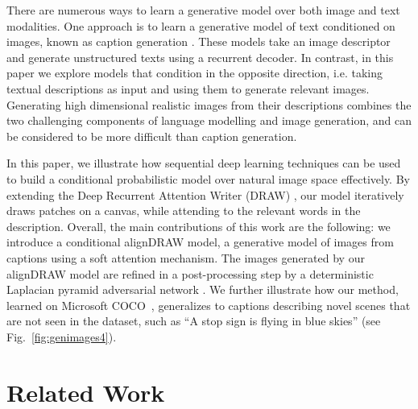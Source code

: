 \documentclass{article} %
\newcommand{\Figref}[1]{Fig.~\ref{#1}}
\begin{document}
There are numerous ways to learn a generative model over both image and text modalities. One approach is to learn a generative model of text conditioned on images, known as caption generation
\citep{karpathy_captions,vinyals_captions,xu_captions}. These models take an image descriptor and generate unstructured texts using a recurrent decoder. In contrast, in this paper we explore models that condition in the opposite direction, i.e. taking textual descriptions as input and using them to generate relevant images.
Generating high dimensional realistic images from their descriptions 
combines the two challenging components of language modelling and image generation, and can be considered to be more difficult than caption generation. %

In this paper, we illustrate how sequential deep learning techniques can be used to build a conditional probabilistic model over natural image space effectively. By extending the Deep Recurrent Attention Writer (DRAW) \citep{gregor_draw}, our model iteratively draws patches on a canvas, while attending to the relevant words in the description. Overall, the main contributions of this work are the following: we introduce a conditional alignDRAW model, a generative model of images from captions using a soft attention mechanism. The images generated by our alignDRAW model are refined in a post-processing step by a deterministic Laplacian pyramid adversarial network \citep{denton_lapgan}. We further 
illustrate how our method, learned on Microsoft COCO~\citep{mscoco}, generalizes to captions describing novel scenes that are not 
seen in the dataset, such as ``A stop sign is flying in blue skies'' (see \Figref{fig:genimages4}). 

\section{Related Work}
\end{document}
